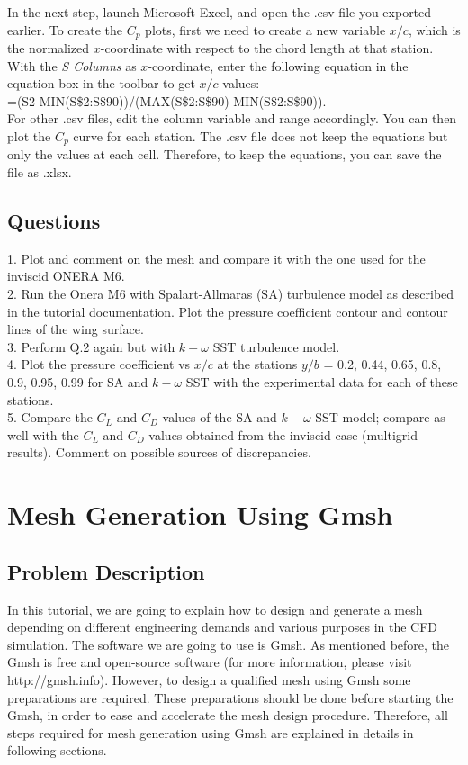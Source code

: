 In the next step, launch Microsoft Excel, and open the .csv file you exported earlier. To create the $C_p$ plots, first we need to create a new
variable $x/c$, which is the normalized $x$-coordinate with respect to the chord length at that station. With the \textit{S Columns} as $x$-coordinate, enter the following equation in the equation-box in the toolbar to get $x/c$ values: \\
=(S2-MIN(S\$2:S\$90))/(MAX(S\$2:S\$90)-MIN(S\$2:S\$90)). \\
For other .csv files, edit the column variable and range accordingly. You can then plot the $C_p$ curve for each station. The .csv file does not keep the equations but only the values at each cell. Therefore, to keep the equations, you can save the file as .xlsx.

\section{Questions}
1. Plot and comment on the mesh and compare it with the one used for the inviscid ONERA M6. \\
2. Run the Onera M6 with Spalart-Allmaras (SA) turbulence model as described in the tutorial documentation. Plot the pressure coefficient contour and contour lines of the wing surface. \\
3. Perform Q.2 again but with $k-\omega$ SST turbulence model. \\
4. Plot the pressure coefficient vs $x/c$ at the stations $y/b$ = 0.2, 0.44, 0.65, 0.8, 0.9, 0.95, 0.99 for SA and $k-\omega$ SST with the
experimental data \cite{schmitt1979pressure} for each of these stations. \\
5. Compare the $C_L$ and $C_D$ values of the SA and $k-\omega$ SST model; compare as well with the $C_L$ and $C_D$ values obtained from
the inviscid case (multigrid results). Comment on possible sources of discrepancies.
\chapter{Mesh Generation Using Gmsh}
\label{ch:Mesh Generation Unisg Gmsh}
\section{Problem Description}
In this tutorial, we are going to explain how to design and generate a mesh depending on different engineering demands and various purposes in the CFD simulation. The software we are going to use is Gmsh. As mentioned before, the Gmsh is free and open-source software (for more information, please visit http://gmsh.info). However, to design a qualified mesh using Gmsh some preparations are required. These preparations should be done before starting the Gmsh, in order to ease and accelerate the mesh design procedure. Therefore, all steps required for mesh generation using Gmsh are explained in details in following sections.
